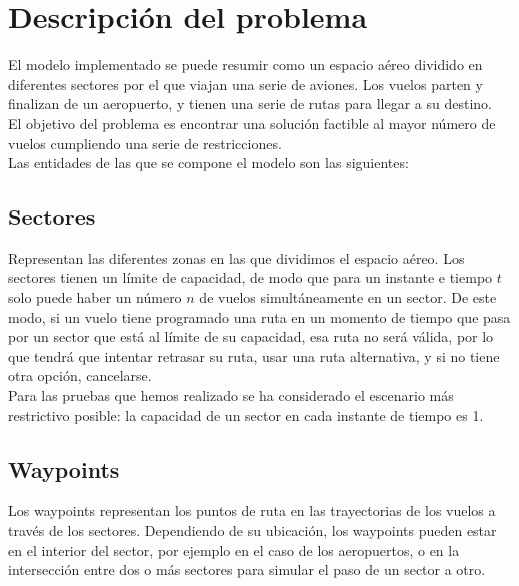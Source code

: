 \chapter{Descripción del problema}
El modelo implementado se puede resumir como un espacio aéreo dividido en diferentes sectores por el que viajan una serie de aviones. Los vuelos parten y finalizan de un aeropuerto, y tienen una serie de rutas para llegar a su destino.\\
El objetivo del problema es encontrar una solución factible al mayor número de vuelos cumpliendo una serie de restricciones.\\
Las entidades de las que se compone el modelo son las siguientes:

\section{Sectores}
Representan las diferentes zonas en las que dividimos el espacio aéreo. Los sectores tienen un límite de capacidad, de modo que para un instante e tiempo $t$ solo puede haber un número $n$ de vuelos simultáneamente en un sector. De este modo, si un vuelo tiene programado una ruta en un momento de tiempo que pasa por un sector que está al límite de su capacidad, esa ruta no será válida, por lo que tendrá que intentar retrasar su ruta, usar una ruta alternativa, y si no tiene otra opción, cancelarse.\\
Para las pruebas que hemos realizado se ha considerado el escenario más restrictivo posible: la capacidad de un sector en cada instante de tiempo es 1.

\section{Waypoints}
Los waypoints representan los puntos de ruta en las trayectorias de los vuelos a través de los sectores. Dependiendo de su ubicación, los waypoints pueden estar en el interior del sector, por ejemplo en el caso de los aeropuertos, o en la intersección entre dos o más sectores para simular el paso de un sector a otro.


